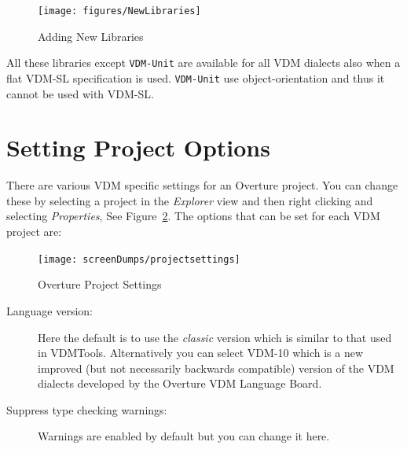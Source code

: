 \documentclass{overturerepchap}
\begin{document}
\begin{figure}[!htb]
	\begin{center}
	  \texttt{[image: figures/NewLibraries]}
	  \caption[Adding New Libraries]{Adding New Libraries}
	  \label{fig:NewLibraries}
	\end{center}
\end{figure}

All these libraries except \texttt{VDM-Unit} are available for all VDM dialects also when a flat
VDM-SL specification is used. \texttt{VDM-Unit} use object-orientation and thus it cannot be used with VDM-SL.

\section{Setting Project Options}\label{subsec:options}

There are various VDM
specific settings for an Overture project. You can change these by
selecting a project
in the \emph{Explorer} view and then right clicking and selecting
\emph{Properties}, See Figure~\ref{fig:VDMSettings}. The options
that can be set for each VDM project are:

\begin{figure}[!hbt]
\begin{center}
  \texttt{[image: screenDumps/projectsettings]}
  \caption[Overture Project Settings]{Overture Project Settings}
  \label{fig:VDMSettings}
\end{center}
\end{figure}

\begin{description}
\item[Language version:] Here the default is to use the
  \emph{classic} version which is similar to that used in
  VDMTools. Alternatively you can select VDM-10 which
  is a new improved (but not necessarily backwards compatible) version of
  the VDM dialects developed by the Overture VDM Language Board.
\item[Suppress type checking warnings:] Warnings are enabled
  by default but you can change it here.
\end{description}
\end{document}
